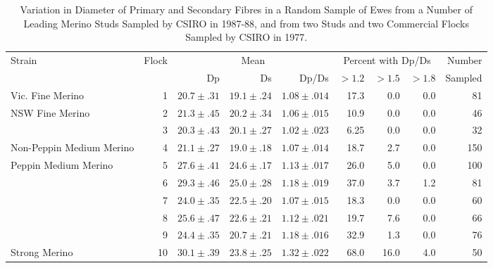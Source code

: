 %

\begin{landscape}
\begin{table}
\centering
\caption{Variation in Diameter of Primary and Secondary Fibres in a Random Sample of 
         Ewes from a Number of Leading Merino Studs Sampled by CSIRO in 1987-88, 
	 and from two Studs and two Commercial Flocks Sampled by CSIRO in 1977.}
\label{tb:4}
\vspace{0.1in}

\begin{tabular}{l|r|rrr|rrr|r}  \hline
 Strain & Flock & \multicolumn{3}{c|}{Mean} &  \multicolumn{3}{c|}{Percent with Dp/Ds} &  Number \\ \cline{3-8}
        &       & Dp & Ds & Dp/Ds &   $>1.2$ &  $>1.5$ & $>1.8$ & Sampled \\ \hline

 Vic. Fine Merino       & 1     & $20.7\pm.31$   & $19.1\pm.24$   & $1.08\pm.014$  & 17.3  & 0.0  & 0.0  & 81 \\ \hline

 NSW Fine Merino        & 2     & $21.3\pm.45$   & $20.2\pm.34$  & $1.06\pm.015$  & 10.9  & 0.0  & 0.0  & 46 \\
                        & 3     & $20.3\pm.43$   & $20.1\pm.27$  & $1.02\pm.023$  &  6.25 & 0.0  & 0.0  & 32 \\ \hline

 Non-Peppin Medium Merino  &  4 & $21.1\pm.27$   & $19.0\pm.18$  &  $1.07\pm.014$ &  18.7 & 2.7  & 0.0  & 150 \\ \hline

 Peppin Medium Merino   & 5     & $27.6\pm.41$   & $24.6\pm.17$  & $1.13\pm.017$  & 26.0  & 5.0  & 0.0  & 100 \\
                        & 6     & $29.3\pm.46$   & $25.0\pm.28$  & $1.18\pm.019$  & 37.0  & 3.7  & 1.2  & 81 \\
                        & 7     & $24.0\pm.35$   & $22.5\pm.20$  & $1.07\pm.015$  & 18.3  & 0.0  & 0.0  & 60 \\
                        & 8     & $25.6\pm.47$   & $22.6\pm.21$  & $1.12\pm.021$  & 19.7  & 7.6  & 0.0  & 66 \\
                        & 9     & $24.4\pm.35$   & $20.7\pm.21$  & $1.18\pm.016$  & 32.9  & 1.3  & 0.0  & 76 \\ \hline

 Strong Merino          & 10    & $30.1\pm.39$  &  $23.8\pm.25$ &  $1.32\pm.022$ &  68.0 & 16.0 & 4.0  & 50 \\ \hline

 

\end{tabular}
\end{table}
\end{landscape}

%

